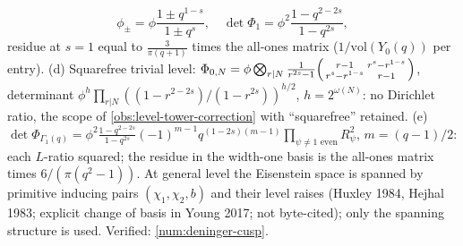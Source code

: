 \begin{theorem}
\[\phi_\pm = \phi\frac{1\pm q^{1-s}}{1\pm q^s},\quad\det\Phi_1 = \phi^2\frac{1-q^{2-2s}}{1-q^{2s}},
\]
residue at $s = 1$ equal to $\tfrac{3}{\pi(q+1)}$ times the all-ones matrix ($1/\mathrm{vol}(Y_0(q))$ per entry). (d) Squarefree
trivial level: $\Phi_{0,N} = \phi\bigotimes_{r|N}\tfrac1{r^{2s}-1}\begin{psmallmatrix}r-1&r^s-r^{1-s}\\r^s-r^{1-s}&r-1\end{psmallmatrix}$,
determinant $\phi^h\prod_{r|N}((1-r^{2-2s})/(1-r^{2s}))^{h/2}$, $h = 2^{\omega(N)}$: no Dirichlet ratio, the scope of
\cref{obs:level-tower-correction} with ``squarefree'' retained. (e) $\det\Phi_{\Gamma_1(q)} = \phi^2\tfrac{1-q^{2-2s}}{1-q^{2s}}
(-1)^{m-1}q^{(1-2s)(m-1)}\prod_{\psi\ne1\text{ even}}R_\psi^2$, $m = (q-1)/2$: each $L$-ratio squared; the residue in the width-one
basis is the all-ones matrix times $6/(\pi(q^2-1))$. At general level the Eisenstein space is spanned by primitive inducing
pairs $(\chi_1,\chi_2,b)$ and their level raises (Huxley 1984, Hejhal 1983; explicit change of basis in Young 2017; not
byte-cited); only the spanning structure is used. Verified: \cref{num:deninger-cusp}.
\end{theorem}

